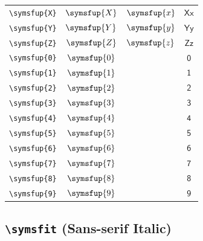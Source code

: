 \documentclass[12pt,a4paper]{article}
\begin{document}
\begin{longtable}{|c|c|c|c|}
\verb|\symsfup{X}| & $\symsfup{X}$ & $\symsfup{x}$ & $ 𝖷 𝗑 $ \\
\verb|\symsfup{Y}| & $\symsfup{Y}$ & $\symsfup{y}$ & $ 𝖸 𝗒 $ \\
\verb|\symsfup{Z}| & $\symsfup{Z}$ & $\symsfup{z}$ & $ 𝖹 𝗓 $ \\
\verb|\symsfup{0}| & $\symsfup{0}$ & & $ 𝟢 $ \\
\verb|\symsfup{1}| & $\symsfup{1}$ & & $ 𝟣 $ \\
\verb|\symsfup{2}| & $\symsfup{2}$ & & $ 𝟤 $ \\
\verb|\symsfup{3}| & $\symsfup{3}$ & & $ 𝟥 $ \\
\verb|\symsfup{4}| & $\symsfup{4}$ & & $ 𝟦 $ \\
\verb|\symsfup{5}| & $\symsfup{5}$ & & $ 𝟧 $ \\
\verb|\symsfup{6}| & $\symsfup{6}$ & & $ 𝟨 $ \\
\verb|\symsfup{7}| & $\symsfup{7}$ & & $ 𝟩 $ \\
\verb|\symsfup{8}| & $\symsfup{8}$ & & $ 𝟪 $ \\
\verb|\symsfup{9}| & $\symsfup{9}$ & & $ 𝟫 $ \\
\hline
\end{longtable}

\newpage

\subsection*{\texttt{\textbackslash{}symsfit} (Sans-serif Italic)}
\end{document}
